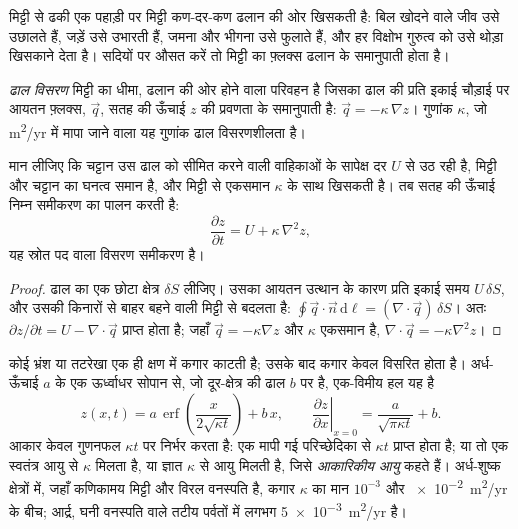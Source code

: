 मिट्टी से ढकी एक पहाड़ी पर मिट्टी कण-दर-कण ढलान की ओर खिसकती है: बिल खोदने वाले
जीव उसे उछालते हैं, जड़ें उसे उभारती हैं, जमना और भीगना उसे फुलाते हैं, और हर
विक्षोभ गुरुत्व को उसे थोड़ा खिसकाने देता है। सदियों पर औसत करें तो मिट्टी का
फ़्लक्स ढलान के समानुपाती होता है।

\begin{definition}[ढाल विसरण]\label{def:b3:quantitative-geomorphology:diffusion}
\emph{ढाल विसरण} मिट्टी का धीमा, ढलान की ओर होने वाला परिवहन है
जिसका ढाल की प्रति इकाई चौड़ाई पर आयतन फ़्लक्स,
$\vec q$, सतह की ऊँचाई $z$ की प्रवणता के समानुपाती है:
$\vec q = -\kappa\,\nabla z$। गुणांक $\kappa$, जो
\unit{m^2/yr} में मापा जाने वाला यह गुणांक ढाल विसरणशीलता है।
\end{definition}

\begin{theorem}[ढालों का विसरण]\label{thm:b3:quantitative-geomorphology:diffusion}
मान लीजिए कि चट्टान उस ढाल को सीमित करने वाली वाहिकाओं के सापेक्ष दर $U$ से
उठ रही है, मिट्टी और चट्टान का घनत्व समान है, और मिट्टी  से
एकसमान $\kappa$ के साथ खिसकती है। तब सतह की ऊँचाई निम्न समीकरण का पालन करती है:
\[
\frac{\partial z}{\partial t} = U + \kappa\,\nabla^2 z ,
\]
यह स्रोत पद वाला विसरण समीकरण है।
\end{theorem}

\begin{proof}
ढाल का एक छोटा क्षेत्र $\delta S$ लीजिए। उसका आयतन उत्थान के कारण
प्रति इकाई समय $U\,\delta S$, और उसकी किनारों से बाहर बहने वाली मिट्टी से
बदलता है: $\oint \vec q\cdot\vec n\,\mathrm{d}\ell = (\nabla\cdot\vec q)\,\delta S$।
अतः $\partial z/\partial t = U - \nabla\cdot\vec q$ प्राप्त होता है; जहाँ $\vec q = -\kappa
\nabla z$ और $\kappa$ एकसमान है, $\nabla\cdot\vec q = -\kappa\nabla^2 z$।
\end{proof}

कोई भ्रंश या तटरेखा एक ही क्षण में कगार काटती है; उसके बाद कगार केवल
विसरित होता है। अर्ध-ऊँचाई $a$ के एक ऊर्ध्वाधर सोपान से, जो
दूर-क्षेत्र की ढाल $b$ पर है, एक-विमीय हल यह है
\[
z(x,t) = a\,\operatorname{erf}\!\left(\frac{x}{2\sqrt{\kappa t}}\right) + b\,x ,
\qquad
\left.\frac{\partial z}{\partial x}\right|_{x=0} = \frac{a}{\sqrt{\pi\kappa t}} + b .
\]
आकार केवल गुणनफल $\kappa t$ पर निर्भर करता है: एक मापी गई परिच्छेदिका से
$\kappa t$ प्राप्त होता है; या तो एक स्वतंत्र आयु से $\kappa$ मिलता है, या ज्ञात
$\kappa$ से आयु मिलती है, जिसे \emph{आकारिकीय आयु} कहते हैं। अर्ध-शुष्क
क्षेत्रों में, जहाँ कणिकामय मिट्टी और विरल वनस्पति है, कगार $\kappa$ का मान
$10^{-3}$ और \qty{e-2}{m^2/yr} के बीच; आर्द्र, घनी वनस्पति वाले तटीय पर्वतों में
लगभग \qty{5e-3}{m^2/yr} है।

